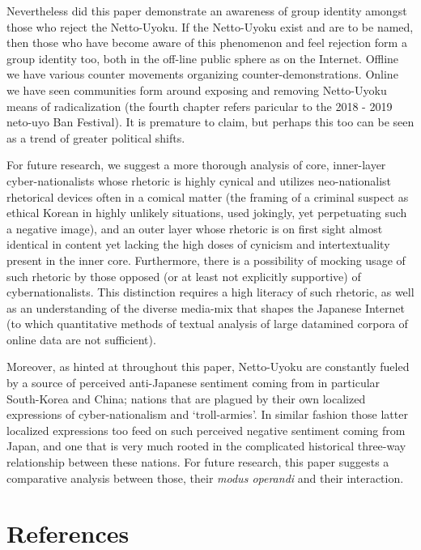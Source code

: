 \documentclass[10pt,british,A4paper,twoside]{memoir}
\begin{document}
Nevertheless did this paper demonstrate an awareness of group identity
amongst those who reject the Netto-Uyoku. If the Netto-Uyoku exist and
are to be named, then those who have become aware of this phenomenon and
feel rejection form a group identity too, both in the off-line public
sphere as on the Internet. Offline we have various counter movements
organizing counter-demonstrations. Online we have seen communities form
around exposing and removing Netto-Uyoku means of radicalization (the
fourth chapter refers paricular to the 2018 - 2019 neto-uyo Ban
Festival). It is premature to claim, but perhaps this too can be seen as
a trend of greater political shifts.

For future research, we suggest a more thorough analysis of core, inner-layer
cyber-nationalists whose rhetoric is highly cynical and utilizes
neo-nationalist rhetorical devices often in a comical matter (the
framing of a criminal suspect as ethical Korean in highly unlikely
situations, used jokingly, yet perpetuating such a negative image), and
an outer layer whose rhetoric is on first sight almost identical in
content yet lacking the high doses of cynicism and intertextuality
present in the inner core. Furthermore, there is a possibility of
mocking usage of such rhetoric by those opposed (or at least not
explicitly supportive) of cybernationalists. This distinction requires a
high literacy of such rhetoric, as well as an understanding of the
diverse media-mix that shapes the Japanese Internet (to which quantitative methods of textual analysis of large datamined corpora of
online data are not sufficient).

Moreover, as hinted at throughout this paper, Netto-Uyoku are constantly
fueled by a source of perceived anti-Japanese sentiment coming from in
particular South-Korea and China; nations that are plagued by their own
localized expressions of cyber-nationalism and `troll-armies'. In
similar fashion those latter localized expressions too feed on such
perceived negative sentiment coming from Japan, and one that is very
much rooted in the complicated historical three-way relationship between
these nations. For future research, this paper suggests a comparative
analysis between those, their \emph{modus operandi} and their
interaction.

\newpage

\begingroup
{}

\chapter*{References}
\end{document}
